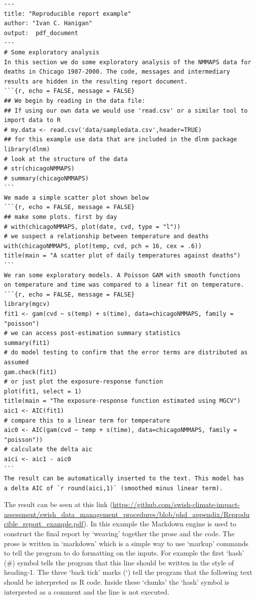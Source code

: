 \documentclass[11pt,a4paper]{article}
\newenvironment{Shaded}{\begin{snugshade}}{\end{snugshade}}
\begin{document}
\begin{singlespace}
\begin{Shaded}
\begin{verbatim}
---
title: "Reproducible report example"
author: "Ivan C. Hanigan"
output:  pdf_document
---
# Some exploratory analysis
In this section we do some exploratory analysis of the NMMAPS data for
deaths in Chicago 1987-2000. The code, messages and intermediary
results are hidden in the resulting report document.
```{r, echo = FALSE, message = FALSE}
## We begin by reading in the data file:
## If using our own data we would use 'read.csv' or a similar tool to import data to R
# my.data <- read.csv('data/sampledata.csv',header=TRUE)
## for this example use data that are included in the dlnm package
library(dlnm)
# look at the structure of the data
# str(chicagoNMMAPS)
# summary(chicagoNMMAPS)
```
We made a simple scatter plot shown below
```{r, echo = FALSE, message = FALSE}
## make some plots. first by day
# with(chicagoNMMAPS, plot(date, cvd, type = "l"))
# we suspect a relationship between temperature and deaths
with(chicagoNMMAPS, plot(temp, cvd, pch = 16, cex = .6))
title(main = "A scatter plot of daily temperatures against deaths")
```
We ran some exploratory models. A Poisson GAM with smooth functions
on temperature and time was compared to a linear fit on temperature.
```{r, echo = FALSE, message = FALSE}
library(mgcv)
fit1 <- gam(cvd ~ s(temp) + s(time), data=chicagoNMMAPS, family = "poisson")
# we can access post-estimation summary statistics
summary(fit1)
# do model testing to confirm that the error terms are distributed as assumed
gam.check(fit1)
# or just plot the exposure-response function
plot(fit1, select = 1)
title(main = "The exposure-response function estimated using MGCV")
aic1 <- AIC(fit1)
# compare this to a linear term for temperature
aic0 <- AIC(gam(cvd ~ temp + s(time), data=chicagoNMMAPS, family = "poisson"))
# calculate the delta aic
aici <- aic1 - aic0
```
The result can be automatically inserted to the text. This model has
a delta AIC of `r round(aici,1)` (smoothed minus linear term).
\end{verbatim}
\end{Shaded}
\end{singlespace}

The result can be seen at this link (\url{https://github.com/swish-climate-impact-assessment/swish_data_management_procedures/blob/phd_appendix/Reproducible_report_example.pdf}). In this example the Markdown engine is used to construct the final report by `weaving' together the prose and the code.  The prose is written in `markdown' which is a simple way to use `markup' commands to tell the program to do formatting on the inputs.  For example the first `hash' (\#) symbol tells the program that this line should be written in the style of heading-1.  The three `back tick' marks (`) tell the program that the following text should be interpreted as R code.  Inside these `chunks' the `hash' symbol is interpreted as a comment and the line is not executed.
\end{document}
